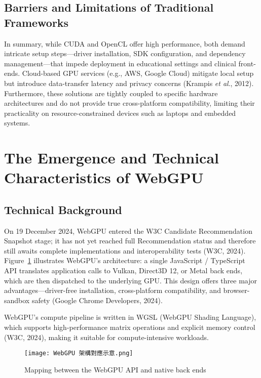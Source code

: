 \documentclass[PhD]{PHlab-thesis}
\begin{document}
\subsection{Barriers and Limitations of Traditional Frameworks}
In summary, while CUDA and OpenCL offer high performance, both demand intricate setup steps—driver installation, SDK configuration, and dependency management—that impede deployment in educational settings and clinical front-ends. Cloud-based GPU services (e.g., AWS, Google Cloud) mitigate local setup but introduce data-transfer latency and privacy concerns (Krampis \emph{et al}., 2012). Furthermore, these solutions are tightly coupled to specific hardware architectures and do not provide true cross-platform compatibility, limiting their practicality on resource-constrained devices such as laptops and embedded systems.

\section{The Emergence and Technical Characteristics of WebGPU}

\subsection{Technical Background}
On 19 December 2024, WebGPU entered the W3C Candidate Recommendation Snapshot stage; it has not yet reached full Recommendation status and therefore still awaits complete implementations and interoperability tests (W3C, 2024). Figure~\ref{fig:webgpu-mapping} illustrates WebGPU's architecture: a single JavaScript / TypeScript API translates application calls to Vulkan, Direct3D 12, or Metal back ends, which are then dispatched to the underlying GPU. This design offers three major advantages—driver-free installation, cross-platform compatibility, and browser-sandbox safety (Google Chrome Developers, 2024).

WebGPU's compute pipeline is written in WGSL (WebGPU Shading Language), which supports high-performance matrix operations and explicit memory control (W3C, 2024), making it suitable for compute-intensive workloads.

\begin{figure}[htbp]
    \centering
    \texttt{[image: WebGPU 架構對應示意.png]}
    \caption{Mapping between the WebGPU API and native back ends}
    \label{fig:webgpu-mapping}
\end{figure}
\end{document}
